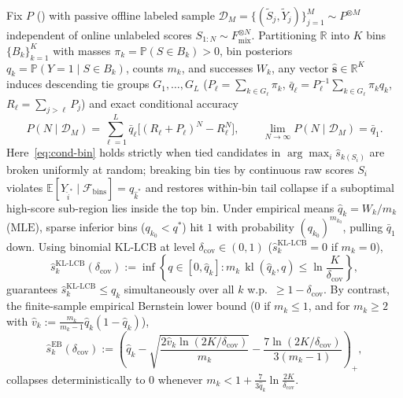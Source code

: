 \documentclass[10pt]{article}
\theoremstyle{plain}
\theoremstyle{definition}
\theoremstyle{remark}
\newcommand{\R}{\mathbb{R}}
\newcommand{\E}{\mathbb{E}}
\newcommand{\Prob}{\mathbb{P}}
\newcommand{\KL}{\operatorname{kl}}
\newcommand{\Fmix}{F_{\mathrm{mix}}}
\begin{document}
Fix $P$ () with passive offline labeled sample $\mathcal{D}_M = \{(\tilde{S}_j, \tilde{Y}_j)\}_{j=1}^M \sim P^{\otimes M}$ independent of online unlabeled scores $S_{1:N} \sim \Fmix^{\otimes N}$. Partitioning $\R$ into $K$ bins $\{B_k\}_{k=1}^K$ with masses $\pi_k = \Prob(S \in B_k) > 0$, bin posteriors $q_k = \Prob(Y=1 \mid S \in B_k)$, counts $m_k$, and successes $W_k$, any vector $\hat{\mathbf{s}} \in \R^K$ induces descending tie groups $G_1, \dots, G_L$ ($P_\ell = \sum_{k\in G_\ell}\pi_k$, $\bar{q}_\ell = P_\ell^{-1}\sum_{k\in G_\ell}\pi_k q_k$, $R_\ell = \sum_{j>\ell} P_j$) and exact conditional accuracy
\begin{equation}
\label{eq:cond-bin}
P(N \mid \mathcal{D}_M) = \sum_{\ell=1}^L \bar{q}_\ell\big[(R_\ell + P_\ell)^N - R_\ell^N\big], \qquad \lim_{N\to\infty} P(N \mid \mathcal{D}_M) = \bar{q}_1.
\end{equation}
Here~\eqref{eq:cond-bin} holds strictly when tied candidates in $\arg\max_i \hat{s}_{k(S_i)}$ are broken uniformly at random; breaking bin ties by continuous raw scores $S_i$ violates $\E[Y_{\hat{i}^*} \mid \mathcal{F}_{\mathrm{bins}}] = q_{\hat{k}^*}$ and restores within-bin tail collapse if a suboptimal high-score sub-region lies inside the top bin. Under empirical means $\hat{q}_k = W_k/m_k$ ($\mathrm{MLE}$), sparse inferior bins ($q_{k_0} < q^*$) hit $1$ with probability $(q_{k_0})^{m_{k_0}}$, pulling $\bar{q}_1$ down. Using binomial $\mathrm{KL\text{-}LCB}$ \citep{garivier2011kl} at level $\delta_{\mathrm{cov}} \in (0, 1)$ ($\hat{s}_k^{\mathrm{KL\text{-}LCB}} = 0$ if $m_k = 0$),
\begin{equation}
\label{eq:kl-lcb}
\hat{s}_k^{\mathrm{KL\text{-}LCB}}(\delta_{\mathrm{cov}}) := \inf\left\{q \in [0, \hat{q}_k] : m_k\, \KL(\hat{q}_k, q) \le \ln\frac{K}{\delta_{\mathrm{cov}}}\right\},
\end{equation}
guarantees $\hat{s}_k^{\mathrm{KL\text{-}LCB}} \le q_k$ simultaneously over all $k$ w.p.\ $\ge 1 - \delta_{\mathrm{cov}}$. By contrast, the finite-sample empirical Bernstein lower bound ($0$ if $m_k \le 1$, and for $m_k \ge 2$ with $\hat{v}_k := \frac{m_k}{m_k-1}\hat{q}_k(1-\hat{q}_k)$),
\begin{equation}
\label{eq:eb-lcb}
\hat{s}_k^{\mathrm{EB}}(\delta_{\mathrm{cov}}) := \left(\hat{q}_k - \sqrt{\frac{2\hat{v}_k \ln(2K/\delta_{\mathrm{cov}})}{m_k}} - \frac{7\ln(2K/\delta_{\mathrm{cov}})}{3(m_k - 1)}\right)_+,
\end{equation}
collapses deterministically to $0$ whenever $m_k < 1 + \frac{7}{3\hat{q}_k}\ln\frac{2K}{\delta_{\mathrm{cov}}}$.
\end{document}

